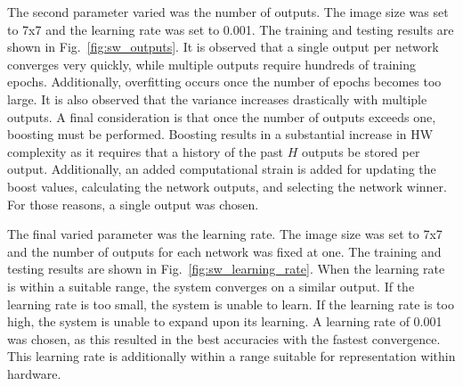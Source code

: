 \documentclass[10pt,journal]{IEEEtran}
\newcommand{\fig}[1]{Fig.~\ref{#1}}
\begin{document}
				The second parameter varied was the number of outputs. The image size was set to 7x7 and the learning rate was set to 0.001. The training and testing results are shown in \fig{fig:sw_outputs}. It is observed that a single output per network converges very quickly, while multiple outputs require hundreds of training epochs. Additionally, overfitting occurs once the number of epochs becomes too large. It is also observed that the variance increases drastically with multiple outputs. A final consideration is that once the number of outputs exceeds one, boosting must be performed. Boosting results in a substantial increase in HW complexity as it requires that a history of the past \(H\) outputs be stored per output. Additionally, an added computational strain is added for updating the boost values, calculating the network outputs, and selecting the network winner. For those reasons, a single output was chosen.
				
				The final varied parameter was the learning rate. The image size was set to 7x7 and the number of outputs for each network was fixed at one. The training and testing results are shown in \fig{fig:sw_learning_rate}. When the learning rate is within a suitable range, the system converges on a similar output. If the learning rate is too small, the system is unable to learn. If the learning rate is too high, the system is unable to expand upon its learning. A learning rate of 0.001 was chosen, as this resulted in the best accuracies with the fastest convergence. This learning rate is additionally within a range suitable for representation within hardware.
			
\end{document}
